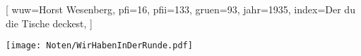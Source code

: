 [
    wuw={Horst Wesenberg}, 
    pfi={16}, 
    pfii={133}, 
    gruen={93}, 
    jahr={1935}, 
    index={Der du die Tische deckest},
]

\beginverse
\endverse
\texttt{[image: Noten/WirHabenInDerRunde.pdf]}

\endsong
